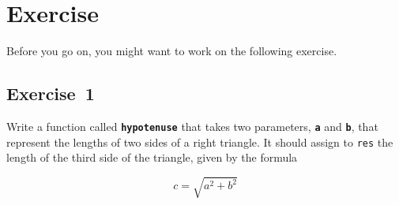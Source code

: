 \section{Exercise}

Before you go on, you might want to work on the following exercise.
\subsection{Exercise~1}
\label{hypotenuse_exercise}
Write a function called \textbf{\lstinline{hypotenuse}} that takes two parameters, \textbf{\lstinline{a}} and \textbf{\lstinline{b}}, that represent the lengths of two sides of a right triangle.  It should assign to \lstinline{res} the length of the third side of the triangle, given by the formula

\[ c = \sqrt{a^2 + b^2} \]


